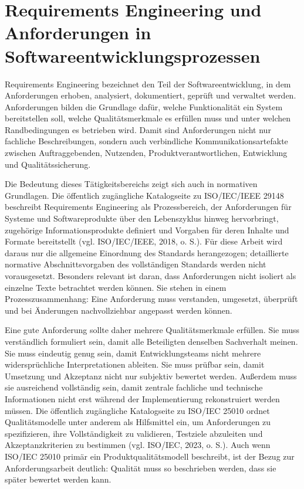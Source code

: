 \documentclass[12pt,a4paper,oneside]{scrreprt}
\begin{document}
\section{Requirements Engineering und Anforderungen in Softwareentwicklungsprozessen}

Requirements Engineering bezeichnet den Teil der Softwareentwicklung, in dem Anforderungen erhoben, analysiert, dokumentiert, geprüft und verwaltet werden. Anforderungen bilden die Grundlage dafür, welche Funktionalität ein System bereitstellen soll, welche Qualitätsmerkmale es erfüllen muss und unter welchen Randbedingungen es betrieben wird. Damit sind Anforderungen nicht nur fachliche Beschreibungen, sondern auch verbindliche Kommunikationsartefakte zwischen Auftraggebenden, Nutzenden, Produktverantwortlichen, Entwicklung und Qualitätssicherung.

Die Bedeutung dieses Tätigkeitsbereichs zeigt sich auch in normativen Grundlagen. Die öffentlich zugängliche Katalogseite zu ISO/IEC/IEEE 29148 beschreibt Requirements Engineering als Prozessbereich, der Anforderungen für Systeme und Softwareprodukte über den Lebenszyklus hinweg hervorbringt, zugehörige Informationsprodukte definiert und Vorgaben für deren Inhalte und Formate bereitstellt (vgl. ISO/IEC/IEEE, 2018, o. S.). Für diese Arbeit wird daraus nur die allgemeine Einordnung des Standards herangezogen; detaillierte normative Abschnittsvorgaben des vollständigen Standards werden nicht vorausgesetzt. Besonders relevant ist daran, dass Anforderungen nicht isoliert als einzelne Texte betrachtet werden können. Sie stehen in einem Prozesszusammenhang: Eine Anforderung muss verstanden, umgesetzt, überprüft und bei Änderungen nachvollziehbar angepasst werden können.

Eine gute Anforderung sollte daher mehrere Qualitätsmerkmale erfüllen. Sie muss verständlich formuliert sein, damit alle Beteiligten denselben Sachverhalt meinen. Sie muss eindeutig genug sein, damit Entwicklungsteams nicht mehrere widersprüchliche Interpretationen ableiten. Sie muss prüfbar sein, damit Umsetzung und Akzeptanz nicht nur subjektiv bewertet werden. Außerdem muss sie ausreichend vollständig sein, damit zentrale fachliche und technische Informationen nicht erst während der Implementierung rekonstruiert werden müssen. Die öffentlich zugängliche Katalogseite zu ISO/IEC 25010 ordnet Qualitätsmodelle unter anderem als Hilfsmittel ein, um Anforderungen zu spezifizieren, ihre Vollständigkeit zu validieren, Testziele abzuleiten und Akzeptanzkriterien zu bestimmen (vgl. ISO/IEC, 2023, o. S.). Auch wenn ISO/IEC 25010 primär ein Produktqualitätsmodell beschreibt, ist der Bezug zur Anforderungsarbeit deutlich: Qualität muss so beschrieben werden, dass sie später bewertet werden kann.
\end{document}
